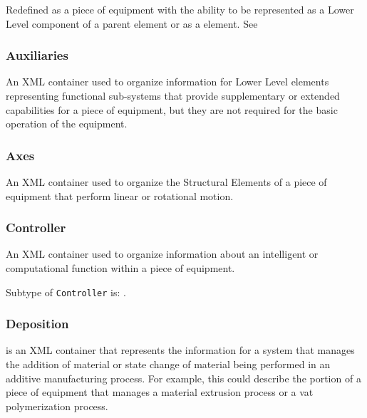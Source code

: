 Redefined as a piece of equipment with the ability to be represented as a \gls{Lower Level} component of a parent  element or as a  element. See 

\FloatBarrier

\subsubsection{Auxiliaries}
  \label{sec:Auxiliaries}



An XML container used to organize information for \gls{Lower Level} elements representing functional sub-systems that provide supplementary or extended capabilities for a piece of equipment, but they are not required for the basic operation of the equipment.

\FloatBarrier

\subsubsection{Axes}
  \label{sec:Axes}



An XML container used to organize the \glspl{Structural Element} of a piece of equipment that perform linear or rotational motion.

\FloatBarrier

\subsubsection{Controller}
  \label{sec:Controller}



An XML container used to organize information about an intelligent or computational function within a piece of equipment.


Subtype of \texttt{Controller} is: .
\FloatBarrier

\subsubsection{Deposition}
  \label{sec:Deposition}



 is an XML container that represents the information for a system that manages the addition of material or state change of material being performed in an additive manufacturing process.  For example, this could describe the portion of a piece of equipment that manages a material extrusion process or a vat polymerization process.

